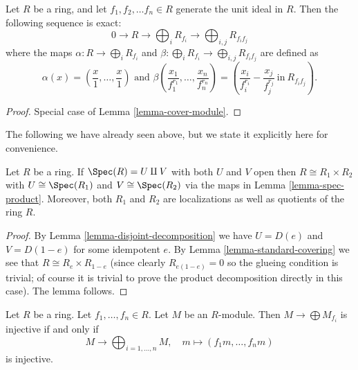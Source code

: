 \begin{lemma}
\label{lemma-standard-covering}
Let $R$ be a ring, and let $f_1, f_2, \ldots f_n\in R$ generate
the unit ideal in $R$.
Then the following sequence is exact:
$$
0 \longrightarrow
R \longrightarrow
\bigoplus\nolimits_i R_{f_i} \longrightarrow
\bigoplus\nolimits_{i, j}R_{f_if_j}
$$
where the maps $\alpha : R \longrightarrow \bigoplus_i R_{f_i}$
and $\beta : \bigoplus_i R_{f_i} \longrightarrow \bigoplus_{i, j} R_{f_if_j}$
are defined as
$$
\alpha(x) = \left(\frac{x}{1}, \ldots, \frac{x}{1}\right)
\text{ and }
\beta\left(\frac{x_1}{f_1^{r_1}}, \ldots, \frac{x_n}{f_n^{r_n}}\right)
=
\left(\frac{x_i}{f_i^{r_i}}-\frac{x_j}{f_j^{r_j}}~\text{in}~R_{f_if_j}\right).
$$
\end{lemma}

\begin{proof}
Special case of Lemma \ref{lemma-cover-module}.
\end{proof}

\noindent
The following we have already seen above, but we state it explicitly here
for convenience.

\begin{lemma}
\label{lemma-disjoint-implies-product}
Let $R$ be a ring.
If $\Spec(R) = U \amalg V$ with both $U$ and $V$ open
then $R \cong R_1 \times R_2$ with $U \cong \Spec(R_1)$
and $V \cong \Spec(R_2)$ via the maps in Lemma \ref{lemma-spec-product}.
Moreover, both $R_1$ and $R_2$ are localizations as well as quotients
of the ring $R$.
\end{lemma}

\begin{proof}
By Lemma \ref{lemma-disjoint-decomposition} we have
$U = D(e)$ and $V = D(1-e)$ for some idempotent $e$.
By Lemma \ref{lemma-standard-covering} we see that
$R \cong R_e \times R_{1 - e}$ (since clearly $R_{e(1-e)} = 0$
so the glueing condition is trivial; of course it is
trivial to prove the product decomposition directly in this
case). The lemma follows.
\end{proof}

\begin{lemma}
\label{lemma-when-injective-covering}
Let $R$ be a ring.
Let $f_1, \ldots, f_n \in R$.
Let $M$ be an $R$-module.
Then $M \to \bigoplus M_{f_i}$ is injective if and only if
$$
M \longrightarrow \bigoplus\nolimits_{i = 1, \ldots, n} M, \quad
m \longmapsto (f_1m, \ldots, f_nm)
$$
is injective.
\end{lemma}

